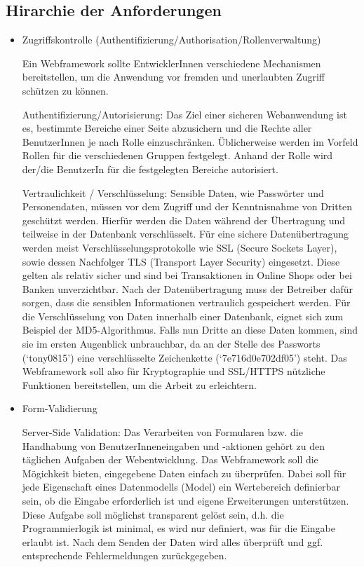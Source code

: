 \documentclass[
11pt, %
a4paper, %
BCOR25mm, %
DIV14, %
footsepline = false, %
headsepline, %
twoside, %
openright,
abstracton, %
listof=totocnumbered, %
bibliography=totocnumbered %
]{scrreprt}
\begin{document}
  \subsection{Hirarchie der Anforderungen}
  
  \begin{itemize}
    \item Zugriffskontrolle (Authentifizierung/Authorisation/Rollenverwaltung)

Ein Webframework sollte EntwicklerInnen verschiedene Mechanismen bereitstellen,
um die Anwendung vor fremden und unerlaubten Zugriff schützen zu können.

Authentifizierung/Autorisierung: Das Ziel einer sicheren Webanwendung ist es,
bestimmte Bereiche einer Seite abzusichern und die Rechte aller BenutzerInnen
je nach Rolle einzuschränken. Üblicherweise werden im Vorfeld Rollen für die
verschiedenen Gruppen festgelegt. Anhand der Rolle wird der/die BenutzerIn für
die festgelegten Bereiche autorisiert.

Vertraulichkeit / Verschlüsselung: Sensible Daten, wie Passwörter und
Personendaten, müssen vor dem Zugriff und der Kenntnisnahme von Dritten
geschützt werden. Hierfür werden die Daten während der Übertragung und
teilweise in der Datenbank verschlüsselt. Für eine sichere Datenübertragung
werden meist Verschlüsselungsprotokolle wie SSL (Secure Sockets Layer), sowie
dessen Nachfolger TLS (Transport Layer Security) eingesetzt. Diese gelten als
relativ sicher und sind bei Transaktionen in Online Shops oder bei Banken
unverzichtbar. Nach der Datenübertragung muss der Betreiber dafür sorgen, dass
die sensiblen Informationen vertraulich gespeichert werden. Für die
Verschlüsselung von Daten innerhalb einer Datenbank, eignet sich zum Beispiel
der MD5-Algorithmus. Falls nun Dritte an diese Daten kommen, sind sie im ersten
Augenblick unbrauchbar, da an der Stelle des Passworts (‘tony0815’) eine
verschlüsselte Zeichenkette (‘7e716d0e702df05’) steht. Das Webframework soll
also für Kryptographie und SSL/HTTPS nützliche Funktionen bereitstellen, um die
Arbeit zu erleichtern.

    \item Form-Validierung

Server-Side Validation: Das Verarbeiten von Formularen bzw. die Handhabung von
BenutzerInneneingaben und -aktionen gehört zu den täglichen Aufgaben der
Webentwicklung. Das Webframework soll die Mögichkeit bieten, eingegebene Daten
einfach zu überprüfen. Dabei soll für jede Eigenschaft eines Datenmodells
(Model) ein Wertebereich definierbar sein, ob die Eingabe erforderlich ist und
eigene Erweiterungen unterstützen. Diese Aufgabe soll möglichst transparent
gelöst sein, d.h. die Programmierlogik ist minimal, es wird nur definiert, was
für die Eingabe erlaubt ist. Nach dem Senden der Daten wird alles überprüft und
ggf. entsprechende Fehlermeldungen zurückgegeben.


\end{itemize}
\end{document}
